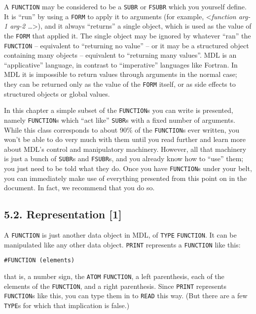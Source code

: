\documentclass[a4paper,]{article}
\begin{document}
A \texttt{FUNCTION} may be considered to be a \texttt{SUBR} or \texttt{FSUBR} which you yourself define. It is ``run'' by
using a \texttt{FORM} to apply it to arguments (for example, \textless{}\emph{function arg-1 arg-2
\ldots{}}\textgreater{}), and it always ``returns'' a single object, which is used as the value of the \texttt{FORM} that
applied it. The single object may be ignored by whatever ``ran'' the \texttt{FUNCTION} -- equivalent to ``returning no
value'' -- or it may be a structured object containing many objects -- equivalent to ``returning many values''. MDL is an
``applicative'' language, in contrast to ``imperative'' languages like Fortran. In MDL it is impossible to return values
through arguments in the normal case; they can be returned only as the value of the \texttt{FORM} itself, or as side
effects to structured objects or global values.

In this chapter a simple subset of the \texttt{FUNCTION}s you can write is presented, namely \texttt{FUNCTION}s which ``act
like'' \texttt{SUBR}s with a fixed number of arguments. While this class corresponds to about 90\% of the
\texttt{FUNCTION}s ever written, you won't be able to do very much with them until you read further and learn more about
MDL's control and manipulatory machinery. However, all that machinery is just a bunch of \texttt{SUBR}s and
\texttt{FSUBR}s, and you already know how to ``use'' them; you just need to be told what they do. Once you have
\texttt{FUNCTION}s under your belt, you can immediately make use of everything presented from this point on in the
document. In fact, we recommend that you do so.

\subsection{5.2. Representation {[}1{]}}\label{representation-1-1}

A \texttt{FUNCTION} is just another data object in MDL, of \texttt{TYPE} \texttt{FUNCTION}. It can be manipulated like any
other data object. \texttt{PRINT} represents a \texttt{FUNCTION} like this:

\begin{verbatim}
#FUNCTION (elements)
\end{verbatim}

that is, a number sign, the \texttt{ATOM} \texttt{FUNCTION}, a left parenthesis, each of the elements of the
\texttt{FUNCTION}, and a right parenthesis. Since \texttt{PRINT} represents \texttt{FUNCTION}s like this, you can type them
in to \texttt{READ} this way. (But there are a few \texttt{TYPE}s for which that implication is false.)
\end{document}
